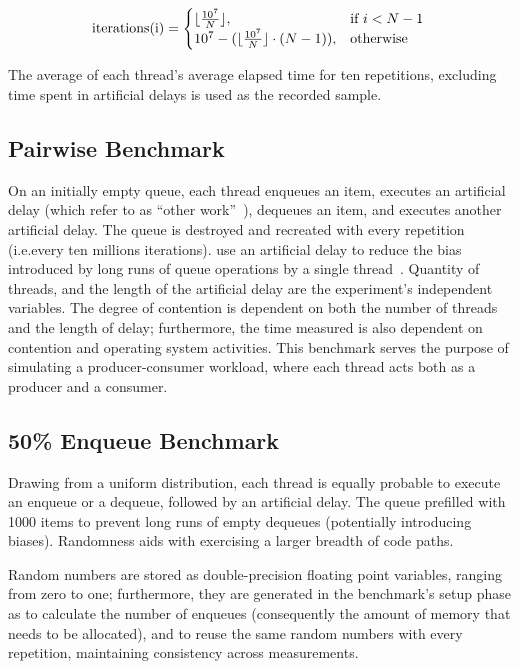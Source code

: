 \[
    \text{iterations(i)} = 
    \begin{cases}
        \lfloor\frac{10^7}{N}\rfloor, & \text{if}~i < N-1 \\
        10^7 - (\lfloor \frac{10^7}{N} \rfloor \cdot (N-1)), & \text{otherwise}
    \end{cases} \\
\]

The average of each thread's average elapsed time for ten repetitions,
excluding time spent in artificial delays is used as the recorded sample.

\subsection{Pairwise Benchmark}

On an initially empty queue, each thread enqueues an item, executes an
artificial delay (which \citeauthor{michael1996simple} refer to as ``other
work''~\citep{michael1996simple}), dequeues an item, and executes another
artificial delay. The queue is destroyed and recreated with every repetition
(i.e.every ten millions iterations). \citeauthor{michael1996simple} use an
artificial delay to reduce the bias introduced by long runs of queue operations
by a single thread~\citep{michael1996simple}. Quantity of threads, and the length
of the artificial delay are the experiment's independent variables.
The degree of contention is dependent on both the number of threads and the length
of delay; furthermore, the time measured is also dependent on
contention and operating system activities. This benchmark serves the purpose
of simulating a producer-consumer workload, where each thread acts both as a
producer and a consumer.

\subsection{50\% Enqueue Benchmark}
Drawing from a uniform distribution, each thread is equally probable to execute
an enqueue or a dequeue, followed by an artificial delay. The queue prefilled
with 1000 items to prevent long runs of empty dequeues (potentially introducing
biases). Randomness aids with exercising a larger breadth of code paths.

Random numbers are stored as double-precision floating point variables, ranging
from zero to one; furthermore, they are generated in the benchmark's setup
phase as to calculate the number of enqueues (consequently the
amount of memory that needs to be allocated), and to reuse the same random
numbers with every repetition, maintaining consistency across measurements. 


